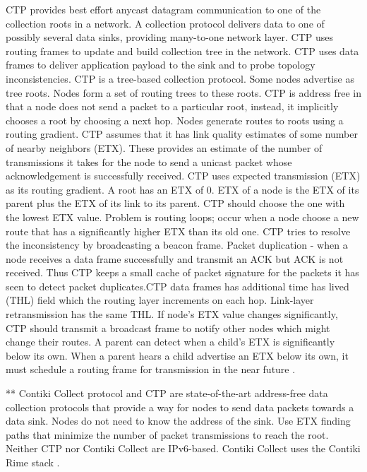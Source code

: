 CTP provides best effort anycast datagram communication to one of the collection roots in a network. A collection protocol delivers data to one of possibly several data sinks, providing many-to-one network layer. CTP uses routing frames to update and build collection tree in the network. CTP uses data frames to deliver application payload to the sink and to probe topology inconsistencies. 
	CTP is a tree-based collection protocol. Some nodes advertise as tree roots. Nodes form a set of routing trees to these roots. CTP is address free in that a node does not send a packet to a particular root, instead, it implicitly chooses a root by choosing a next hop. Nodes generate routes to roots using a routing gradient. CTP assumes that it has link quality estimates of some number of nearby neighbors (ETX). These provides an estimate of the number of transmissions it takes for the node to send a unicast packet whose acknowledgement is successfully received. 
CTP uses expected transmission (ETX) as its routing gradient. A root has an ETX of 0. ETX of a node is the ETX of its parent plus the ETX of its link to its parent. CTP should choose the one with the lowest ETX value. 
Problem is routing loops; occur when a node choose a new route that has a significantly higher ETX than its old one. CTP tries to resolve the inconsistency by broadcasting a beacon frame. Packet duplication - when a node receives a data frame successfully and transmit an ACK but ACK is not received. Thus CTP keeps a small cache of packet signature for the packets it has seen to detect packet duplicates.CTP data frames has additional time has lived (THL) field which the routing layer increments on each hop. Link-layer retransmission has the same THL.
If node’s ETX value changes significantly, CTP should transmit a broadcast frame to notify other nodes which might change their routes. A parent can detect when a child’s ETX is significantly below its own. When a parent hears a child advertise an ETX below its own, it must schedule a routing frame for transmission in the near future \cite{ctptep}.

**
Contiki Collect protocol and CTP are state-of-the-art address-free data collection protocols that provide a way for nodes to send data packets towards a data sink. Nodes do not need to know the address of the sink. Use ETX finding paths that minimize the number of packet transmissions to reach the root. Neither CTP nor Contiki Collect are IPv6-based. Contiki Collect uses the Contiki Rime stack \cite{beyondInteroperability}.


